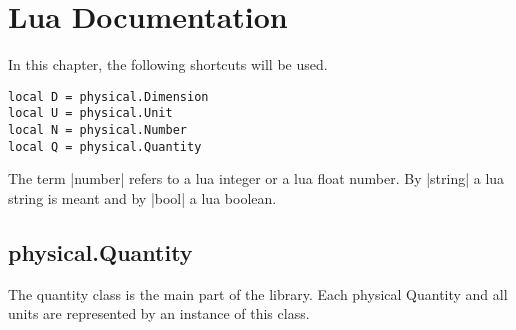 \documentclass{ltxdoc}
\begin{document}
















\newpage
\section{Lua Documentation}

\newcommand{\method}[2]{\subsection*{|#1.#2|}\index[lua]{\texttt{#1.#2}}}

\newcommand{\subtitle}[1]{\noindent \\\textbf{#1}}

\lstset{language=Lua}

In this chapter, the following shortcuts will be used.
\begin{lstlisting}
local D = physical.Dimension
local U = physical.Unit
local N = physical.Number
local Q = physical.Quantity
\end{lstlisting}

The term |number| refers to a lua integer or a lua float number. By |string| a lua string is meant and by |bool| a lua boolean.



\subsection{physical.Quantity}
The quantity class is the main part of the library. Each physical Quantity and all units are represented by an instance of this class.
\end{document}
